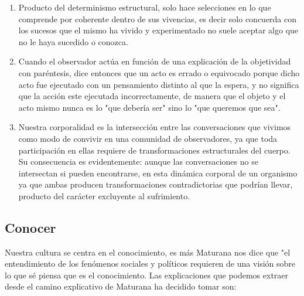 \documentclass[10pt]{article}
\begin{document}
        \begin{enumerate}
            \item Producto del determinismo estructural, solo hace selecciones en lo que comprende por coherente dentro de sus vivencias, es decir solo concuerda con los sucesos que el mismo ha vivido y experimentado no suele aceptar algo que no le haya sucedido o conozca.
            \item Cuando el observador actúa en función de una explicación de la objetividad con paréntesis, dice entonces que un acto es errado o equivocado porque dicho acto fue ejecutado con un pensamiento distinto al que la espera, y no significa que la acción este ejecutada incorrectamente, de manera que el objeto y el acto mismo nunca es lo "que debería ser" sino lo "que queremos que sea".
            \item Nuestra corporalidad es la intersección entre las conversaciones que vivimos como modo de convivir en una comunidad de observadores, ya que toda participación en ellas requiere de transformaciones estructurales del cuerpo. Su consecuencia es evidentemente: aunque las conversaciones no se intersectan si pueden encontrarse, en esta dinámica corporal de un organismo ya que ambas producen transformaciones contradictorias que podrían llevar, producto del carácter excluyente al sufrimiento.
        \end{enumerate}

        \subsection{Conocer}

        Nuestra cultura se centra en el conocimiento, es más Maturana nos dice que "el entendimiento de los fenómenos sociales y políticos requieren de una visión sobre lo que sé piensa que es el conocimiento. Las explicaciones que podemos extraer desde el camino explicativo de Maturana ha decidido tomar son:
        
\end{document}
